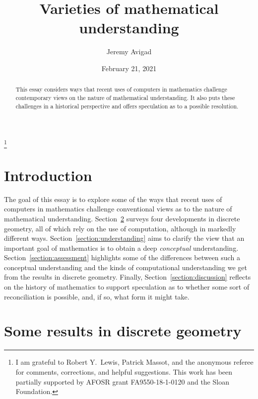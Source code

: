 \documentclass{amsart}
\theoremstyle{definition}
\theoremstyle{remark}
\numberwithin{equation}{section}
\begin{document}
\title{Varieties of mathematical understanding}

\author{Jeremy Avigad}
\address{Department of Philosophy, Baker Hall 161, Carnegie Mellon University, Pittsburgh, PA 15213, USA}
\curraddr{}
\thanks{I am grateful to Robert Y.~Lewis, Patrick Massot, and the anonymous referee for comments, corrections, and helpful suggestions. This work has been partially supported by AFOSR grant FA9550-18-1-0120 and the Sloan Foundation.}


\date{February 21, 2021}

\dedicatory{}

\begin{abstract}
This essay considers ways that recent uses of computers in mathematics challenge contemporary views on the nature of mathematical understanding. It also puts these challenges in a historical perspective and offers speculation as to a possible resolution.
\end{abstract}

\maketitle

\section{Introduction}

The goal of this essay is to explore some of the ways that recent uses of computers in mathematics challenge conventional views as to the nature of mathematical understanding. Section~\ref{section:theorems} surveys four developments in discrete geometry, all of which rely on the use of computation, although in markedly different ways. Section~\ref{section:understanding} aims to clarify the view that an important goal of mathematics is to obtain a deep \emph{conceptual} understanding. Section~\ref{section:assessment} highlights some of the differences between such a conceptual understanding and the kinds of computational understanding we get from the results in discrete geometry. Finally, Section~\ref{section:discussion} reflects on the history of mathematics to support speculation as to whether some sort of reconciliation is possible, and, if so, what form it might take.

\section{Some results in discrete geometry}
\label{section:theorems}
\end{document}
